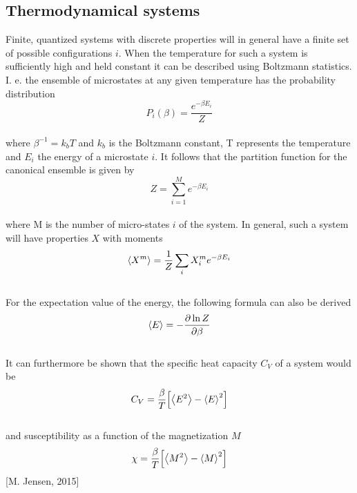 \documentclass[%
reprint,nofootinbib,
amsmath,amssymb,
aps,
]{revtex4-1}
\begin{document}
\subsection*{Thermodynamical systems} \noindent 
Finite, quantized systems with discrete properties will in general have a finite set of possible configurations $i$. When the temperature for such a system is sufficiently high and held constant it can be described using  Boltzmann statistics. I. e. the ensemble of microstates at any given temperature has the probability distribution \vspace{1mm}
\begin{equation}\label{tr}
P_i(\beta) = \dfrac{e^{-\beta E_i}}{Z}
\end{equation}  \vspace{1mm} \\ 
where $\beta^{-1} = k_bT$ and $k_b$ is the Boltzmann constant, T represents the temperature and $E_i$ the energy of a microstate $i$. It follows that the partition function for the canonical ensemble is given by\vspace{1mm}
\begin{equation}\label{pf}
Z = \sum_{i = 1}^{M}e^{-\beta E_i}
\end{equation}\vspace{1mm} \\ 
where M is the number of micro-states $i$ of the system. In general, such a system will have properties $X$ with moments \vspace{1mm}
\begin{equation*}
\expval{X^m} = \dfrac{1}{Z}\sum_iX_i^me^{-\beta E_i}
\end{equation*}\vspace{1mm} \\ 
For the expectation value of the energy, the following formula can also be derived \vspace{1mm} \\ 
\begin{equation}\label{ev}
\expval{E} = -\dfrac{\partial\ln Z}{\partial\beta}
\end{equation}\vspace{1mm} \\ 
It can furthermore be shown that the specific heat capacity $C_V$ of a system would be \vspace{1mm} \\ 
\begin{equation}\label{cv}
C_V = \dfrac{\beta}{T}\qty[\expval{E^2}-\expval{E}^2]
\end{equation}\vspace{1mm} \\ 
and susceptibility as a function of the magnetization $M$ \vspace{1mm} \\ 
\begin{equation}\label{chi}
\chi = \dfrac{\beta}{T}\qty[\expval{M^2}- \expval{M}^2] \vspace{4mm}
\end{equation} 
\hspace{6cm}[M. Jensen, 2015]
\end{document}
